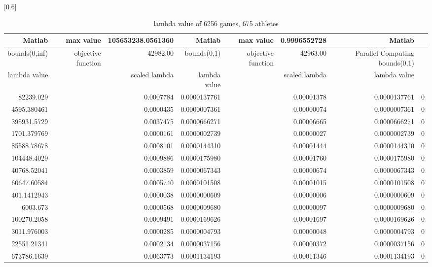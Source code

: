 \documentclass[
journal=jacsat, %
manuscript=article]{achemso}
\begin{document}
\begin{table}[htbp]
  \centering
  \caption{lambda value of 6256 games, 675 athletes}
  \scalebox{0.6}[0.6]{%
    \begin{tabular}{rrrrrrrr}
    \toprule
        Matlab & max value & 105653238.0561360 & Matlab & max value & 0.9996552728 & Matlab \\
    \hline
    bounds(0,inf) & objective function & 42982.00 & bounds(0,1) & objective function & 42963.00 &  Parallel Computing bounds(0,1) \\
    \hline
    lambda value &       & scaled lambda & lambda value  &       & scaled lambda & lambda value  \\
    \bottomrule
    82239.029 &       & 0.0007784 & 0.0000137761 &       & 0.00001378 & 0.0000137761 & 0 \\
    4595.380461 &       & 0.0000435 & 0.0000007361 &       & 0.00000074 & 0.0000007361 & 0 \\
    395931.5729 &       & 0.0037475 & 0.0000666271 &       & 0.00006665 & 0.0000666271 & 0 \\
    1701.379769 &       & 0.0000161 & 0.0000002739 &       & 0.00000027 & 0.0000002739 & 0 \\
    85588.78678 &       & 0.0008101 & 0.0000144310 &       & 0.00001444 & 0.0000144310 & 0 \\
    104448.4029 &       & 0.0009886 & 0.0000175980 &       & 0.00001760 & 0.0000175980 & 0 \\
    40768.52041 &       & 0.0003859 & 0.0000067343 &       & 0.00000674 & 0.0000067343 & 0 \\
    60647.60584 &       & 0.0005740 & 0.0000101508 &       & 0.00001015 & 0.0000101508 & 0 \\
    401.1412943 &       & 0.0000038 & 0.0000000609 &       & 0.00000006 & 0.0000000609 & 0 \\
    6003.673 &       & 0.0000568 & 0.0000009680 &       & 0.00000097 & 0.0000009680 & 0 \\
    100270.2058 &       & 0.0009491 & 0.0000169626 &       & 0.00001697 & 0.0000169626 & 0 \\
    3011.976003 &       & 0.0000285 & 0.0000004793 &       & 0.00000048 & 0.0000004793 & 0 \\
    22551.21341 &       & 0.0002134 & 0.0000037156 &       & 0.00000372 & 0.0000037156 & 0 \\
    673786.1639 &       & 0.0063773 & 0.0001134193 &       & 0.00011346 & 0.0001134193 & 0 \\

\end{tabular}}
\end{table}
\end{document}
